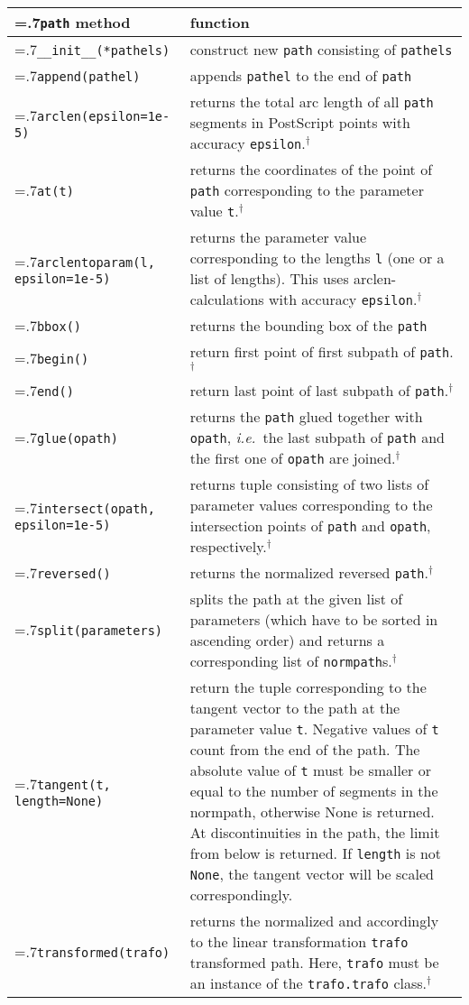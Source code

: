 \medskip
\begin{tabularx}{\linewidth}{>{\hsize=.7\hsize}X>{\raggedright\arraybackslash\hsize=1.3\hsize}X}
  \texttt{path} method & function \\
  \hline \texttt{\_\_init\_\_(*pathels)} & construct new \texttt{path}
  consisting of \texttt{pathels}\\
  \texttt{append(pathel)} & appends \texttt{pathel} to the end of 
  \texttt{path}\\
  \texttt{arclen(epsilon=1e-5)} & returns the total arc length of
  all \texttt{path} segments in PostScript points with accuracy
  \texttt{epsilon}.$^\dagger$\\
  \texttt{at(t)} & returns the coordinates of the point of
  \texttt{path} corresponding to the parameter value
  \texttt{t}.$^\dagger$\\
  \texttt{arclentoparam(l, \newline\phantom{lentopar(}epsilon=1e-5)} & returns the
  parameter value corresponding to the lengths \texttt{l} (one or a list of
  lengths). This uses arclen-calculations with accuracy
  \texttt{epsilon}.$^\dagger$\\
  \texttt{bbox()} & returns the bounding box of the \texttt{path}\\
  \texttt{begin()} & return first point of first subpath of
  \texttt{path}.$^\dagger$\\
  \texttt{end()} & return last point of last subpath of
  \texttt{path}.$^\dagger$\\
  \texttt{glue(opath)} & returns the \texttt{path} glued together with
  \texttt{opath}, \textit{i.e.}\ the last subpath of \texttt{path}
  and the first one of \texttt{opath} are joined.$^\dagger$\\
  \texttt{intersect(opath, \newline\phantom{intersect(}epsilon=1e-5)}
  & returns tuple consisting of two lists of parameter values
  corresponding to the
  intersection points of \texttt{path} and \texttt{opath}, respectively.$^\dagger$\\
  \texttt{reversed()} & returns the normalized reversed
  \texttt{path}.$^\dagger$\\
  \texttt{split(parameters)} & splits the path at the given list of
  parameters (which have to be sorted in ascending order) and returns
  a corresponding list of 
  \texttt{normpath}s.$^\dagger$\\
    \texttt{tangent(t, length=None)} & return the tuple corresponding to
    the tangent vector to the path at the parameter value \texttt{t}.
    Negative values of \texttt{t} count
    from the end of the path. The absolute value of \texttt{t} must be
    smaller or equal to the number of segments in the normpath,
    otherwise None is returned.  At discontinuities in the path, the
    limit from below is returned. If \texttt{length} is not
  \texttt{None}, the tangent vector will be scaled correspondingly.
  \\
  \texttt{transformed(trafo)} & returns the normalized and accordingly
  to the linear transformation \texttt{trafo} transformed path. Here,
  \texttt{trafo} must be an instance of the \texttt{trafo.trafo}
  class.$^\dagger$
\end{tabularx} 
\medskip

